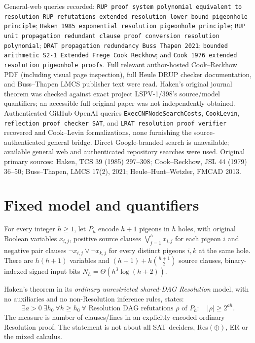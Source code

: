 \documentclass[11pt]{article}
\begin{document}
General-web queries recorded: \texttt{RUP proof system polynomial equivalent to resolution RUP refutations extended resolution lower bound pigeonhole principle}; \texttt{Haken 1985 exponential resolution pigeonhole principle}; \texttt{RUP unit propagation redundant clause proof conversion resolution polynomial}; \texttt{DRAT propagation redundancy Buss Thapen 2021}; \texttt{bounded arithmetic S2-1 Extended Frege Cook Reckhow}; and \texttt{Cook 1976 extended resolution pigeonhole proofs}. Full relevant author-hosted Cook--Reckhow PDF (including visual page inspection), full Heule DRUP checker documentation, and Buss--Thapen LMCS publisher text were read. Haken's original journal theorem was checked against exact project LSPV-1/398's source/model quantifiers; an accessible full original paper was not independently obtained. Authenticated GitHub OpenAI queries \texttt{ExecCNFNodeSearchCosts}, \texttt{CookLevin}, \texttt{reflection proof checker SAT}, and \texttt{LRAT resolution proof verifier} recovered  and Cook--Levin formalizations, none furnishing the source-authenticated general bridge. Direct Google-branded search is unavailable; available general web and authenticated repository searches were used. Original primary sources: Haken, TCS 39 (1985) 297--308; Cook--Reckhow, JSL 44 (1979) 36--50; Buss--Thapen, LMCS 17(2), 2021; Heule--Hunt--Wetzler, FMCAD 2013.

\section*{Fixed model and quantifiers}
For every integer $h\ge1$, let $P_h$ encode $h+1$ pigeons in $h$ holes, with original Boolean variables $x_{i,j}$, positive source clauses $\bigvee_{j=1}^{h}x_{i,j}$ for each pigeon $i$ and negative pair clauses $\neg x_{i,j}\vee\neg x_{k,j}$ for every distinct pigeons $i,k$ at the same hole. There are $h(h+1)$ variables and $(h+1)+h\binom{h+1}{2}$ source clauses, binary-indexed signed input bits $N_h=\Theta(h^3\log(h+2))$.

Haken's theorem in its \emph{ordinary unrestricted shared-DAG Resolution} model, with no auxiliaries and no non-Resolution inference rules, states:
\[
\exists a>0\ \exists h_0\ \forall h\ge h_0\ \forall\text{ Resolution DAG refutations }\rho\text{ of }P_h:
\quad |\rho|\ge 2^{ah}.
\]
The measure is number of clauses/lines in an explicitly encoded ordinary Resolution proof. The statement is not about all SAT deciders, Res$(\oplus)$, ER or the mixed calculus.
\end{document}
